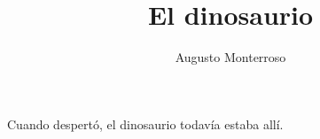 \documentclass[courier]{sffms}
\author{Augusto Monterroso}
\title{El dinosaurio}
\begin{document}
Cuando despert\'o, el dinosaurio todav\'ia estaba all\'i.
\end{document}
